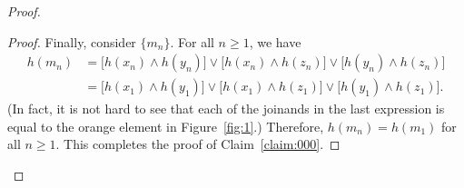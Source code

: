\begin{proof}
\begin{proof}
Finally, consider $\{m_n\}$. For all $n\geq 1$, we have
\begin{align*}
h(m_n) &= \bigl[h(x_n) \wedge h(y_n)\bigr] \vee \bigl[h(x_n) \wedge h(z_n)\bigr]\vee \bigl[h(y_n) \wedge h(z_n)\bigr] \\
&= \bigl[h(x_1) \wedge h(y_1)\bigr] \vee \bigl[h(x_1) \wedge h(z_1)\bigr]\vee \bigl[h(y_1) \wedge h(z_1)\bigr].
\end{align*}
(In fact, it is not hard to see that each of the joinands in the last expression is equal
to the orange element in Figure~\ref{fig:1}.)  Therefore, $h(m_n) = h(m_1)$ for all $n\geq 1$.
This completes the proof of Claim~\ref{claim:000}.\end{proof}
\end{proof}

